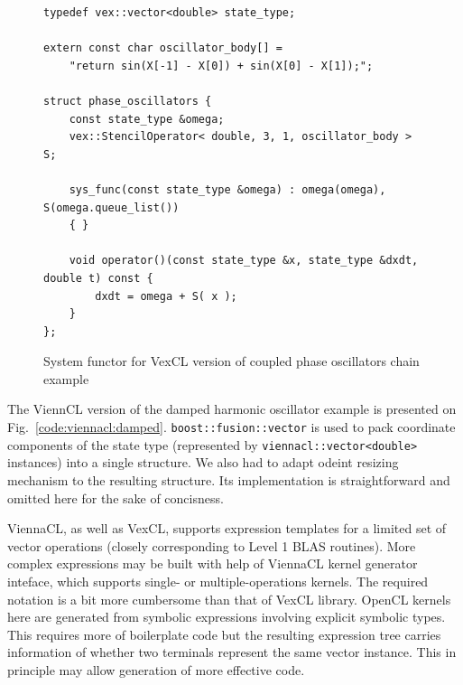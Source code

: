 \documentclass[1p]{elsarticle}
\newcommand{\code}[1]{\lstinline|#1|}
\newcommand{\figref}[1]{Fig.~\ref{#1}}
\begin{document}
\begin{figure}[p]
\begin{lstlisting}
typedef vex::vector<double> state_type;

extern const char oscillator_body[] =
    "return sin(X[-1] - X[0]) + sin(X[0] - X[1]);";

struct phase_oscillators {
    const state_type &omega;
    vex::StencilOperator< double, 3, 1, oscillator_body > S;

    sys_func(const state_type &omega) : omega(omega), S(omega.queue_list())
    { }

    void operator()(const state_type &x, state_type &dxdt, double t) const {
        dxdt = omega + S( x );
    }
};
\end{lstlisting}
\caption{System functor for VexCL version of coupled phase oscillators chain
example}
\label{code:vexcl:phase}
\end{figure}

The ViennCL version of the damped harmonic oscillator example is presented on
\figref{code:viennacl:damped}. \code{boost::fusion::vector} is used to pack
coordinate components of the state type (represented by
\code{viennacl::vector<double>} instances) into a single structure. We also had
to adapt odeint resizing mechanism to the resulting structure. Its
implementation is straightforward and omitted here for the sake of concisness.

ViennaCL, as well as VexCL, supports expression templates for a limited set of
vector operations (closely corresponding to Level 1 BLAS routines). More
complex expressions may be built with help of ViennaCL kernel generator
inteface, which supports single- or multiple-operations kernels. The required
notation is a bit more cumbersome than that of VexCL library. OpenCL kernels
here are generated from symbolic expressions involving explicit symbolic types.
This requires more of boilerplate code but the resulting expression tree
carries information of whether two terminals represent the same vector
instance. This in principle may allow generation of more effective code.
\end{document}
